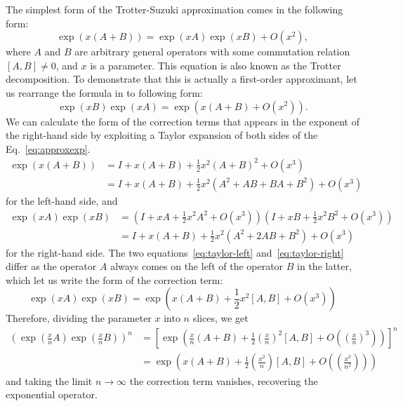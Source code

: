 The simplest form of the Trotter-Suzuki approximation comes in the following form:
\begin{equation} \label{eq:approxexp}
\exp\left({x(A+B)}\right) = \exp\left({xA}\right)\exp\left({xB}\right) + O(x^2), 
\end{equation}
where $A$ and $B$ are arbitrary general operators with some commutation relation $[A,B] \neq 0$, and $x$ is a parameter. This equation is also known as the Trotter decomposition. To demonstrate that this is actually a first-order approximant, let us rearrange the formula in to following form:
\begin{equation}
\exp\left({xB}\right)\exp\left({xA}\right) = \exp\left({x(A+B) + O(x^2)}\right).
\end{equation}
We can calculate the form of the correction terms that appears in the exponent of the right-hand side by exploiting a Taylor expansion of both sides of the Eq.~\eqref{eq:approxexp}.
\begin{subequations} \label{eq:taylor-left}
\begin{align}
\exp\left({x(A+B)}\right) &= I + x(A+B) + \frac{1}{2} x^2 (A+B)^2 + O(x^3) \\
& = I + x(A+B) + \frac{1}{2} x^2 (A^2 + AB + BA + B^2) + O(x^3) 
\end{align}
\end{subequations}
for the left-hand side, and
\begin{subequations}  \label{eq:taylor-right}
\begin{align}
\exp\left({xA}\right)\exp\left({xB}\right) &= (I + xA + \frac{1}{2} x^2 A^2 + O(x^3)) (I + xB + \frac{1}{2} x^2 B^2 + O(x^3))\\
& = I + x(A+B) + \frac{1}{2} x^2 (A^2 + 2AB + B^2) + O(x^3)  
\end{align}
\end{subequations}
for the right-hand side. The two equations~\eqref{eq:taylor-left} and~\eqref{eq:taylor-right} differ as the operator $A$ always comes on the left of the operator $B$ in the latter, which let us write the form of the correction term:
\begin{equation}
\exp\left({xA}\right) \exp\left({xB}\right) = \exp\left({x(A+B) + \frac{1}{2} x^2 [A,B] + O(x^3)}\right)
\end{equation}
Therefore, dividing the parameter $x$ into $n$ slices, we get
\begin{align}
\left(\exp\left({\frac{x}{n}A}\right) \exp\left({\frac{x}{n}B}\right) \right)^n &= \left[ \exp\left({\frac{x}{n}(A + B) + \frac{1}{2}\left(\frac{x}{n}\right)^2 [A,B] + O\left(\left(\frac{x}{n}\right)^3\right)}\right) \right]^n \\
&= \exp\left({x(A+B) + \frac{1}{2}\left(\frac{x^2}{n}\right) [A,B] + O\left(\left(\frac{x^3}{n^2}\right)\right)}\right) 
\end{align}
and taking the limit $n \rightarrow \infty$ the correction term vanishes, recovering the exponential operator.

